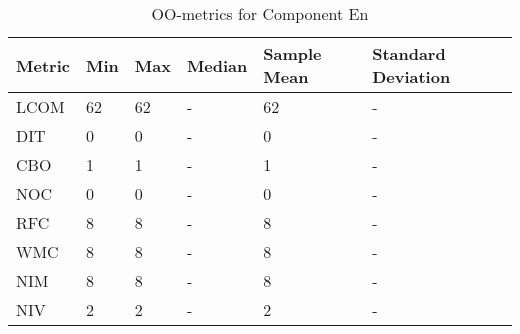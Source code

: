 \begin{table}[]
\centering
\caption{OO-metrics for Component En}
\label{tab:oometrics-en}
\begin{tabular}{|l|l|l|l|l|l|}
\hline
\textbf{Metric} & \textbf{Min} & \textbf{Max} & \textbf{Median} & \textbf{Sample Mean} & \textbf{Standard Deviation} \\ \hline
LCOM            & 62           & 62           & -               & 62                   & -                           \\ \hline
DIT             & 0            & 0            & -               & 0                    & -                           \\ \hline
CBO             & 1            & 1            & -               & 1                    & -                           \\ \hline
NOC             & 0            & 0            & -               & 0                    & -                           \\ \hline
RFC             & 8            & 8            & -               & 8                    & -                           \\ \hline
WMC             & 8            & 8            & -               & 8                    & -                           \\ \hline
NIM             & 8            & 8            & -               & 8                    & -                           \\ \hline
NIV             & 2            & 2            & -               & 2                    & -                           \\ \hline
\end{tabular}
\end{table}




